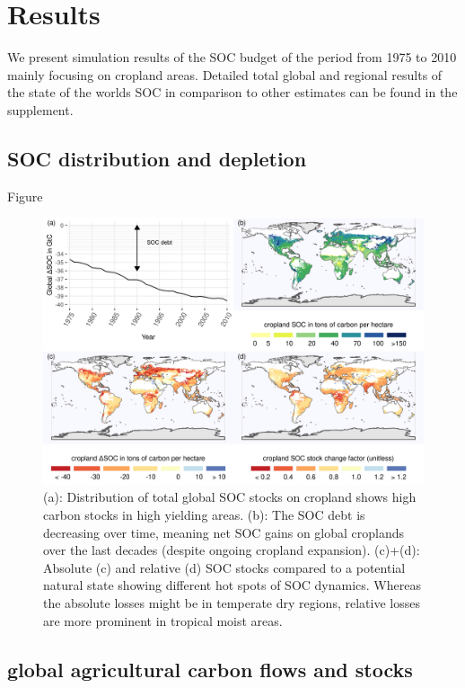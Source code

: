 \documentclass[gc, manuscript]{copernicus}
\begin{document}
\hypertarget{results}{%
\section{Results}\label{results}}

We present simulation results of the SOC budget of the period from 1975 to 2010 mainly focusing on cropland areas. Detailed total global and regional results of the state of the worlds SOC in comparison to other estimates can be found in the supplement.

\hypertarget{soc-distribution-and-depletion}{%
\subsection{SOC distribution and depletion}\label{soc-distribution-and-depletion}}

Figure

\begin{figure}[H]
\includegraphics[width=18cm]{../ResultNotebooks/Output/Images/4panelfigure} \caption{(a): Distribution of total global SOC stocks on cropland shows high carbon stocks in high yielding areas. (b): The SOC debt is decreasing over time, meaning net SOC gains on global croplands over the last decades (despite ongoing cropland expansion). (c)+(d): Absolute (c) and relative (d) SOC stocks compared to a potential natural state showing different hot spots of SOC dynamics. Whereas the absolute losses might be in temperate dry regions, relative losses are more prominent in tropical moist areas.}\label{fig:SOCmaps}
\end{figure}

\hypertarget{global-agricultural-carbon-flows-and-stocks}{%
\subsection{global agricultural carbon flows and stocks}\label{global-agricultural-carbon-flows-and-stocks}}
\end{document}
